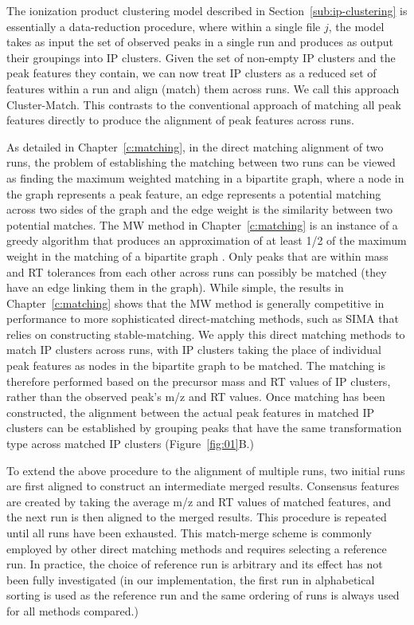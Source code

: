 The ionization product clustering model described in Section~\ref{sub:ip-clustering} is essentially a data-reduction procedure, where within a single file $j$, the model takes as input the set of observed peaks in a single run and produces as output their groupings into IP clusters. Given the set of non-empty IP clusters and the peak features they contain, we can now treat IP clusters as a reduced set of features within a run and align (match) them across runs. We call this approach Cluster-Match. This contrasts to the conventional approach of matching all peak features directly to produce the alignment of peak features across runs. 

As detailed in Chapter~\ref{c:matching}, in the direct matching alignment of two runs, the problem of establishing the matching between two runs can be viewed as finding the maximum weighted matching in a bipartite graph, where a node in the graph represents a peak feature, an edge represents a potential matching across two sides of the graph and the edge weight is the similarity between two potential matches. The MW method  in Chapter~\ref{c:matching} is an instance of a greedy algorithm that produces an approximation of at least 1/2 of the maximum weight in the matching of a bipartite graph \cite{Maximum2011}. Only peaks that are within mass and RT tolerances from each other across runs can possibly be matched (they have an edge linking them in the graph). While simple, the results in Chapter~\ref{c:matching} shows that the MW method is generally competitive in performance to more sophisticated direct-matching methods, such as SIMA that relies on constructing stable-matching. We apply this direct matching methods to match IP clusters across runs, with IP clusters taking the place of individual peak features as nodes in the bipartite graph to be matched. The matching is therefore performed based on the precursor mass and RT values of IP clusters, rather than the observed peak's m/z and RT values. Once matching has been constructed, the alignment between the actual peak features in matched IP clusters can be established by grouping peaks that have the same transformation type across matched IP clusters (Figure~\ref{fig:01}B.)

To extend the above procedure to the alignment of multiple runs, two initial runs are first aligned to construct an intermediate merged results. Consensus features are created by taking the average m/z and RT values of matched features, and the next run is then aligned to the merged results. This procedure is repeated until all runs have been exhausted. This match-merge scheme is commonly employed by other direct matching methods \cite{Voss2011a, Pluskal2010} and requires selecting a reference run. In practice, the choice of reference run is arbitrary and its effect has not been fully investigated (in our implementation, the first run in alphabetical sorting is used as the reference run and the same ordering of runs is always used for all methods compared.)

